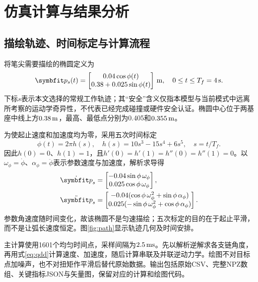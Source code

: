 \section{仿真计算与结果分析}

\subsection{描绘轨迹、时间标定与计算流程}
\label{sec:trajectory}

将笔尖需要描绘的椭圆定义为
\begin{equation}
\vect p_s(t)=\begin{bmatrix}0.04\cos\phi(t)\\0.38+0.025\sin\phi(t)\end{bmatrix}\units m,
\quad 0\leq t\leq T_f=4\units s.
\label{eq:safe_path}
\end{equation}
下标$s$表示本文选择的常规工作轨迹；其“安全”含义仅指本模型与当前模式中远离所考察的运动学奇异性，不代表已经完成碰撞或硬件安全认证。椭圆中心位于两基座中线上方$0.38\,\mathrm{m}$，最高、最低点分别为0.405和$0.355\,\mathrm{m}$。

为使起止速度和加速度均为零，采用五次时间标定
\begin{equation}
\phi(t)=2\pi h(s),\quad h(s)=10s^3-15s^4+6s^5,\quad s=t/T_f.
\end{equation}
因此$h(0)=0$、$h(1)=1$，且$h'(0)=h'(1)=h''(0)=h''(1)=0$。以$\omega_\phi=\dot\phi$、$\alpha_\phi=\ddot\phi$表示参数速度与加速度，解析求导得
\begin{align}
\dot{\vect p}_s&=\begin{bmatrix}-0.04\sin\phi\,\omega_\phi\\0.025\cos\phi\,\omega_\phi\end{bmatrix},\\
\ddot{\vect p}_s&=\begin{bmatrix}
-0.04(\cos\phi\,\omega_\phi^2+\sin\phi\,\alpha_\phi)\\
0.025(-\sin\phi\,\omega_\phi^2+\cos\phi\,\alpha_\phi)
\end{bmatrix}.
\end{align}
参数角速度随时间变化，故该椭圆不是匀速描绘；五次标定的目的在于起止平滑，而不是让弧长速度恒定。图\ref{fig:path}显示轨迹几何及时间安排。


主计算使用1601个均匀时间点，采样间隔为$2.5\,\mathrm{ms}$。先以解析逆解求各支链角度，再用式\eqref{eq:qdd}计算速度、加速度，随后计算串联及并联逆动力学。绘图不对目标点加噪声，也不对扭矩作平滑后替代原始数据。输出包括原始CSV、完整NPZ数组、关键指标JSON与矢量图，保留对应的计算和绘图代码。

